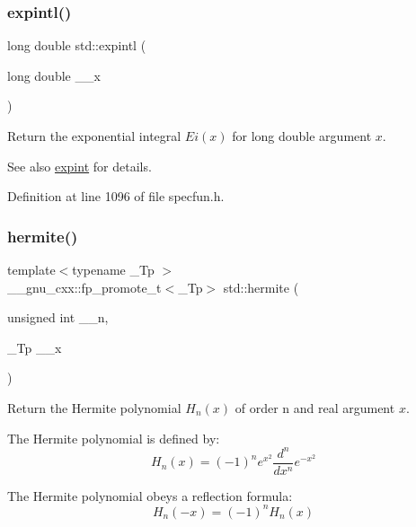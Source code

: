 \subsubsection{\texorpdfstring{expintl()}{expintl()}}
{\footnotesize\ttfamily long double std\+::expintl (\begin{DoxyParamCaption}\item[{long double}]{\+\_\+\+\_\+x }\end{DoxyParamCaption})\hspace{0.3cm}{\ttfamily [inline]}}

Return the exponential integral $ Ei(x) $ for {\ttfamily long double} argument $ x $.

\begin{DoxySeeAlso}{See also}
\hyperlink{group__cxx17__math__spec__func_ga0e9ac717a106ef54184b5f058c451782}{expint} for details. 
\end{DoxySeeAlso}


Definition at line 1096 of file specfun.\+h.

\mbox{\label{group__cxx17__math__spec__func_ga8bd1626f1e3f7256c4fd13579f881183}} 
\subsubsection{\texorpdfstring{hermite()}{hermite()}}
{\footnotesize\ttfamily template$<$typename \+\_\+\+Tp $>$ \\
\+\_\+\+\_\+gnu\+\_\+cxx\+::fp\+\_\+promote\+\_\+t$<$\+\_\+\+Tp$>$ std\+::hermite (\begin{DoxyParamCaption}\item[{unsigned int}]{\+\_\+\+\_\+n,  }\item[{\+\_\+\+Tp}]{\+\_\+\+\_\+x }\end{DoxyParamCaption})\hspace{0.3cm}{\ttfamily [inline]}}

Return the Hermite polynomial $ H_n(x) $ of order n and {\ttfamily real} argument $ x $.

The Hermite polynomial is defined by\+: \[ H_n(x) = (-1)^n e^{x^2} \frac{d^n}{dx^n} e^{-x^2} \]

The Hermite polynomial obeys a reflection formula\+: \[ H_n(-x) = (-1)^n H_n(x) \]



